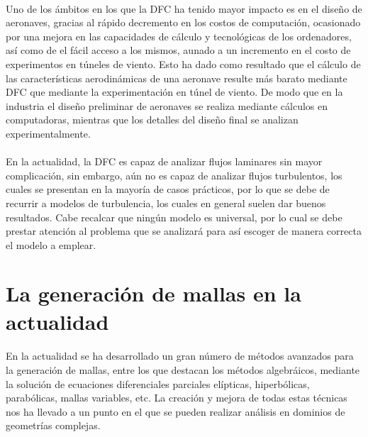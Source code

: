 \documentclass[letterpaper, openright, 12pt]{book}
\begin{document}
    \paragraph*{}
    Uno de los ámbitos en los que la DFC ha tenido mayor impacto es en el
    diseño de aeronaves, gracias al rápido decremento en los costos de
    computación, ocasionado por una mejora en las capacidades de cálculo y
    tecnológicas de los ordenadores, así como de el fácil acceso a los mismos,
    aunado a un incremento en el costo de experimentos en túneles de viento.
    Esto ha dado como resultado que el cálculo de las características
    aerodinámicas de una aeronave resulte más barato mediante DFC que mediante
    la experimentación en túnel de viento. De modo que en la industria el
    diseño preliminar de aeronaves se realiza mediante cálculos en
    computadoras, mientras que los detalles del diseño final se analizan
    experimentalmente.\cite{anderson-yotros}

    \paragraph*{}
    En la actualidad, la DFC es capaz de analizar flujos laminares sin mayor
    complicación, sin embargo, aún no es capaz de analizar flujos turbulentos,
    los cuales se presentan en la mayoría de casos prácticos, por lo que se
    debe de recurrir a modelos de turbulencia, los cuales en general suelen
    dar buenos resultados. Cabe recalcar que ningún modelo es universal, por
    lo cual se debe prestar atención al problema que se analizará para así
    escoger de manera correcta el modelo a emplear.\cite{cengel}

    \section{La generación de mallas en la actualidad}
    \paragraph*{}
    En la actualidad se ha desarrollado un gran número de métodos avanzados
    para la generación de mallas, entre los que destacan los métodos
    algebráicos, mediante la solución de ecuaciones diferenciales parciales
    elípticas, hiperbólicas, parabólicas, mallas variables, etc. La creación y
    mejora de todas estas técnicas nos ha llevado a un punto en el que se
    pueden realizar análisis en dominios de geometrías complejas.
\end{document}
